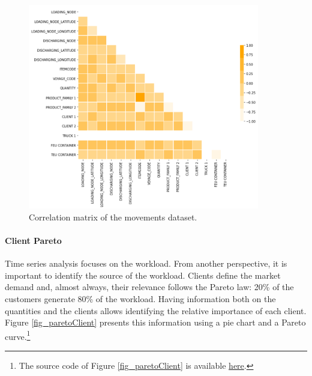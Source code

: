\begin{figure}[hbt!]
\centering
\includegraphics[width=0.9\textwidth]{SectionDistribution/control_figures/fig_demand_correlation.png}
\captionsetup{type=figure}
\caption{Correlation matrix of the movements dataset.}
\label{fig_demand_correlation}
\end{figure}

\clearpage %
\paragraph{Client Pareto}
Time series analysis focuses on the workload. From another perspective, it is important to identify the source of the workload. Clients define the market demand and, almost always, their relevance follows the Pareto law: 20\% of the customers generate 80\% of the workload. Having information both on the quantities and the clients allows identifying the relative importance of each client. Figure \ref{fig_paretoClient} presents this information using a pie chart and a Pareto curve.\footnote{The source code of Figure \ref{fig_paretoClient} is available \href{https://github.com/aletuf93/logproj/blob/master/examples/DIST_01\%20Supply\%20Chain\%20Assessment.ipynb}{here}.}

